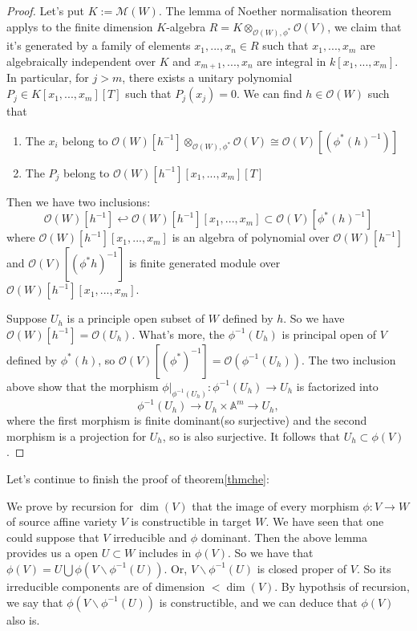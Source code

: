 \documentclass[12pt,a4paper,english]{article}
\theoremstyle{plain}
\theoremstyle{definition}
\theoremstyle{remark}
\begin{document}
\begin{proof}
Let's put $K:=\mathcal{M}(W)$. The lemma of Noether normalisation theorem applys to the finite dimension $K$-algebra $R=K\otimes_{\mathcal{O}(W),\phi^{*}}\mathcal{O}(V)$, we claim that it's generated by a family of elements $x_{1},...,x_{n}\in R$ such that $x_{1},...,x_{m}$ are algebraically independent over $K$ and $x_{m+1},...,x_{n}$ are integral in $k[x_{1},...,x_{m}]$. In particular, for $j> m$, there exists a unitary polynomial $P_{j}\in K[x_{1},...,x_{m}][T]$ such that $P_{j}(x_{j})=0$. We can find $h\in\mathcal{O}(W)$ such that 
\begin{enumerate}
    \item The $x_{i}$ belong to $\mathcal{O}(W)[h^{-1}]\otimes_{\mathcal{O}(W),\phi^{*}}\mathcal{O}(V)\cong \mathcal{O}(V)[(\phi^{*}(h)^{-1})]$
    \item The $P_{j}$ belong to $\mathcal{O}(W)[h^{-1}][x_{1},...,x_{m}][T]$ 
\end{enumerate}
Then we have two inclusions:
\begin{equation*}
    \mathcal{O}(W)[h^{-1}]\hookleftarrow \mathcal{O}(W)[h^{-1}][x_{1},...,x_{m}]\subset \mathcal{O}(V)[\phi^{*}(h)^{-1}]
\end{equation*}
where $\mathcal{O}(W)[h^{-1}][x_{1},...,x_{m}]$ is an algebra of polynomial over $\mathcal{O}(W)[h^{-1}]$ and $\mathcal{O}(V)[(\phi^{*}h)^{-1}]$ is finite generated module over $\mathcal{O}(W)[h^{-1}][x_{1},...,x_{m}]$.

Suppose $U_{h}$ is a principle open subset of $W$ defined by $h$. So we have $\mathcal{O}(W)[h^{-1}]=\mathcal{O}(U_{h})$. What's more,  the $\phi^{-1}(U_{h}) $ is principal open of $V$ defined by $\phi^{*}(h)$, so $\mathcal{O}(V)[(\phi^{*})^{-1}]=\mathcal{O}(\phi^{-1}(U_{h}))$. The two inclusion above show that the morphism $\phi|_{\phi^{-1}(U_{h})}:\phi^{-1}(U_{h})\rightarrow U_{h}$ is factorized into 
\begin{equation*}
    \phi^{-1}(U_{h})\rightarrow U_{h}\times \mathbb{A}^{m}\rightarrow U_{h},
\end{equation*}
where the first morphism is finite dominant(so surjective) and the second morphism is a projection for $U_{h}$, so is also surjective. It follows that $U_{h}\subset \phi(V)$. 
\end{proof}
Let's continue to finish the proof of theorem\ref{thmche}:

We prove by recursion for $\dim(V)$ that the image of every morphism $\phi: V\rightarrow W$ of source affine variety $V$ is constructible in target $W$. We have seen that one could suppose that $V$ irreducible and $\phi$ dominant. Then the above lemma provides us a open $U\subset W$ includes in $\phi(V)$. So we have that $\phi(V)=U\bigcup \phi(V\backslash\phi^{-1}(U))$. Or, $V\backslash\phi^{-1}(U)$ is closed proper of $V$. So its irreducible components are of dimension $<\dim(V)$. By hypothsis of recursion, we say that $\phi(V\backslash\phi^{-1}(U))$ is constructible, and we can deduce that $\phi(V)$ also is.
\end{document}
